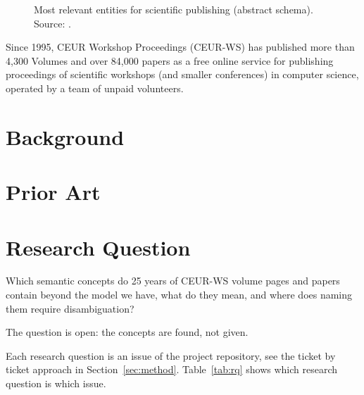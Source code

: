 \documentclass{ceurart}
\begin{document}
\begin{figure}[h]
    \centering
    
    \caption{Most relevant entities for scientific publishing (abstract schema). Source: \cite{FahlHLBD27}.}
    \label{fig:core_entities}
\end{figure}

Since 1995, CEUR Workshop Proceedings (CEUR-WS) has published more than
4,300 Volumes and over 84,000 papers as a free online service for publishing
proceedings of scientific workshops (and smaller conferences) in computer
science, operated by a team of unpaid volunteers.

\section{Background}\label{sec:background}

\section{Prior Art}\label{sec:priorart}

\section{Research Question}\label{sec:rq}

Which semantic concepts do 25 years of CEUR-WS volume pages and papers
contain beyond the model we have, what do they mean, and where does naming
them require disambiguation?

The question is open: the concepts are found, not given.

Each research question is an issue of the project repository, see the ticket
by ticket approach in Section~\ref{sec:method}. Table~\ref{tab:rq} shows
which research question is which issue.
\end{document}
